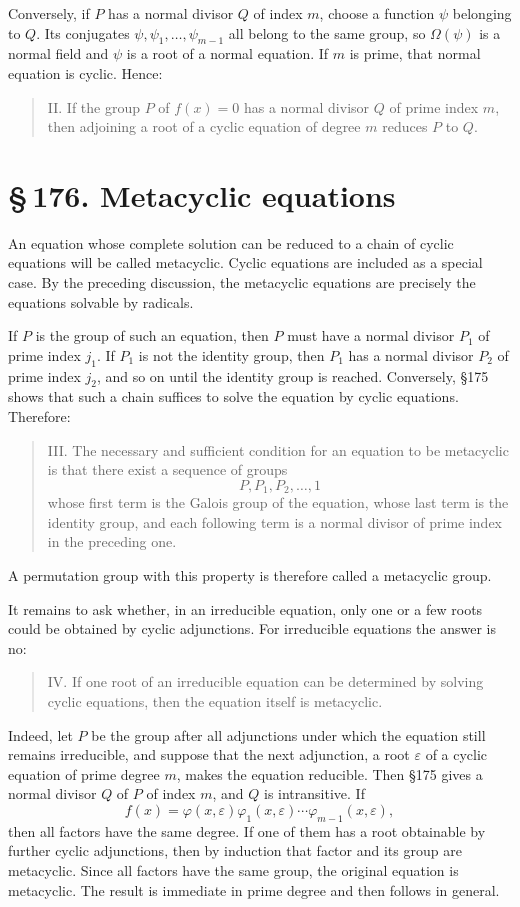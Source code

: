 \documentclass[11pt]{article}
\providecommand{\sect}[2]{\section*{\S\,#1. #2}}
\begin{document}
Conversely, if $P$ has a normal divisor $Q$ of index $m$, choose a function $\psi$ belonging to $Q$. Its conjugates $\psi,
\psi_1,
\ldots,
\psi_{m-1}$ all belong to the same group, so $\Omega(\psi)$ is a normal field and $\psi$ is a root of a normal equation. If $m$ is prime, that normal equation is cyclic. Hence:

\begin{quote}
II. If the group $P$ of $f(x)=0$ has a normal divisor $Q$ of prime index $m$, then adjoining a root of a cyclic equation of degree $m$ reduces $P$ to $Q$.
\end{quote}

\sect{176}{Metacyclic equations}

An equation whose complete solution can be reduced to a chain of cyclic equations will be called metacyclic. Cyclic equations are included as a special case. By the preceding discussion, the metacyclic equations are precisely the equations solvable by radicals.

If $P$ is the group of such an equation, then $P$ must have a normal divisor $P_1$ of prime index $j_1$. If $P_1$ is not the identity group, then $P_1$ has a normal divisor $P_2$ of prime index $j_2$, and so on until the identity group is reached. Conversely, §175 shows that such a chain suffices to solve the equation by cyclic equations. Therefore:

\begin{quote}
III. The necessary and sufficient condition for an equation to be metacyclic is that there exist a sequence of groups
\[
        P,
        P_1,
        P_2,
        \ldots,
        1
\]
whose first term is the Galois group of the equation, whose last term is the identity group, and each following term is a normal divisor of prime index in the preceding one.
\end{quote}

A permutation group with this property is therefore called a metacyclic group.

It remains to ask whether, in an irreducible equation, only one or a few roots could be obtained by cyclic adjunctions. For irreducible equations the answer is no:

\begin{quote}
IV. If one root of an irreducible equation can be determined by solving cyclic equations, then the equation itself is metacyclic.
\end{quote}

Indeed, let $P$ be the group after all adjunctions under which the equation still remains irreducible, and suppose that the next adjunction, a root $\varepsilon$ of a cyclic equation of prime degree $m$, makes the equation reducible. Then §175 gives a normal divisor $Q$ of $P$ of index $m$, and $Q$ is intransitive. If
\[
        f(x)=\varphi(x,
\varepsilon)\varphi_1(x,
\varepsilon)\cdots
        \varphi_{m-1}(x,
\varepsilon),
\]
then all factors have the same degree. If one of them has a root obtainable by further cyclic adjunctions, then by induction that factor and its group are metacyclic. Since all factors have the same group, the original equation is metacyclic. The result is immediate in prime degree and then follows in general.
\end{document}

